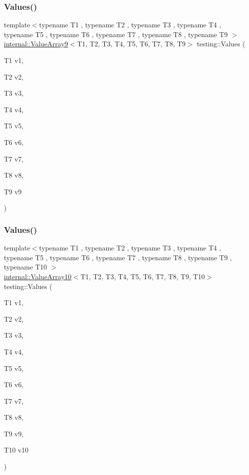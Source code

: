 \mbox{\label{namespacetesting_ab663e13807ad5cc223814797c9191a58}} 
\subsubsection{\texorpdfstring{Values()}{Values()}\hspace{0.1cm}{\footnotesize\ttfamily [9/50]}}
{\footnotesize\ttfamily template$<$typename T1 , typename T2 , typename T3 , typename T4 , typename T5 , typename T6 , typename T7 , typename T8 , typename T9 $>$ \\
\mbox{\hyperlink{classtesting_1_1internal_1_1ValueArray9}{internal\+::\+Value\+Array9}}$<$T1, T2, T3, T4, T5, T6, T7, T8, T9$>$ testing\+::\+Values (\begin{DoxyParamCaption}\item[{T1}]{v1,  }\item[{T2}]{v2,  }\item[{T3}]{v3,  }\item[{T4}]{v4,  }\item[{T5}]{v5,  }\item[{T6}]{v6,  }\item[{T7}]{v7,  }\item[{T8}]{v8,  }\item[{T9}]{v9 }\end{DoxyParamCaption})}

\mbox{\label{namespacetesting_a2948b0215fce80155fdbad4e3608f4cd}} 
\subsubsection{\texorpdfstring{Values()}{Values()}\hspace{0.1cm}{\footnotesize\ttfamily [10/50]}}
{\footnotesize\ttfamily template$<$typename T1 , typename T2 , typename T3 , typename T4 , typename T5 , typename T6 , typename T7 , typename T8 , typename T9 , typename T10 $>$ \\
\mbox{\hyperlink{classtesting_1_1internal_1_1ValueArray10}{internal\+::\+Value\+Array10}}$<$T1, T2, T3, T4, T5, T6, T7, T8, T9, T10$>$ testing\+::\+Values (\begin{DoxyParamCaption}\item[{T1}]{v1,  }\item[{T2}]{v2,  }\item[{T3}]{v3,  }\item[{T4}]{v4,  }\item[{T5}]{v5,  }\item[{T6}]{v6,  }\item[{T7}]{v7,  }\item[{T8}]{v8,  }\item[{T9}]{v9,  }\item[{T10}]{v10 }\end{DoxyParamCaption})}

